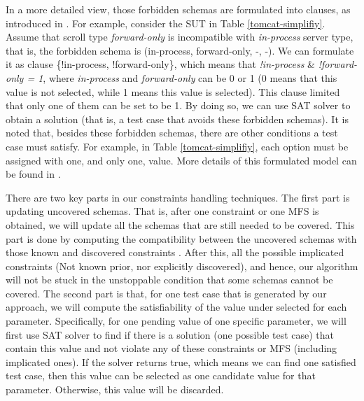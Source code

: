 \documentclass[journal,12pt,onecolumn,draftclsnofoot,]{IEEEtran}
\begin{document}
In a more detailed view, those forbidden schemas are formulated into clauses, as introduced in \cite{cohen2008constructing}. For example, consider the SUT in Table \ref{tomcat-simplifiy}. Assume that scroll type \emph{forward-only} is incompatible with \emph{in-process} server type, that is, the forbidden schema is (in-process, forward-only, -, -). We can formulate it as clause \{!in-process, !forward-only\}, which means that \emph{ !in-process} \&  \emph{!forward-only = 1}, where \emph{in-process} and \emph{forward-only} can be 0 or 1 (0 means that this value is not selected, while 1 means this value is selected). This clause limited that only one of them can be set to be 1.  By doing so, we can use SAT solver \cite{Berkelaar2004} to obtain a solution (that is, a test case that avoids these forbidden schemas). It is noted that, besides these forbidden schemas, there are other conditions a test case must satisfy. For example, in Table \ref{tomcat-simplifiy}, each option must be assigned with one, and only one, value. More details of this formulated model can be found in \cite{cohen2008constructing,cohen2007exploiting}.

There are two key parts in our constraints handling techniques. The first part is updating uncovered schemas. That is, after one constraint or one MFS is obtained, we will update all the schemas that are still needed to be covered.  This part is done by computing the compatibility between the uncovered schemas with those known and discovered constraints \cite{cohen2008constructing}.  After this, all the possible implicated constraints (Not known prior, nor explicitly discovered), and hence, our algorithm will not be stuck in the unstoppable condition that some schemas cannot be covered. The second part is that, for one test case that is generated by our approach, we will compute the satisfiability of the value under selected for each parameter. Specifically, for one pending value of one specific parameter, we will first use SAT solver to find if there is a solution (one possible test case) that contain this value and not violate any of these constraints or MFS (including implicated ones). If the solver returns true, which means we can find one satisfied test case, then this value can be selected as one candidate value for that parameter. Otherwise, this value will be discarded.

%
\end{document}
